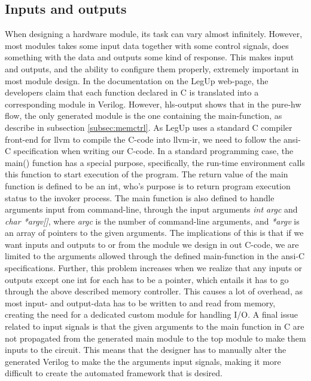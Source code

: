 \subsection{\label{subsec:inoutprobs}Inputs and outputs}
When designing a hardware module, its task can vary almost infinitely. However, most modules takes some input data together with some control signals, does something with the data and outputs some kind of response. This makes input and outputs, and the ability to configure them properly, extremely important in most module design. In the documentation on the LegUp web-page, the developers claim that each function declared in C is translated into a corresponding module in Verilog. However, \gls{hls}-output shows that in the pure-\gls{hw} flow, the only generated module is the one containing the main-function, as describe in subsection \ref{subsec:memctrl}. As LegUp uses a standard C compiler front-end for \gls{llvm} to compile the C-code into \gls{llvm}-\gls{ir}, we need to follow the \gls{ansi}-C specification when writing our C-code. In a standard programming case, the main() function has a special purpose, specifically, the run-time environment calls this function to start execution of the program. The return value of the main function is defined to be an int, who's purpose is to return program execution status to the invoker process. The main function is also defined to handle arguments input from command-line, through the input arguments \textit{int argc} and \textit{char *argv[]}, where \textit{argc} is the number of command-line arguments, and \textit{*argv} is an array of pointers to the given arguments. The implications of this is that if we want inputs and outputs to or from the module we design in out C-code, we are limited to the arguments allowed through the defined main-function in the \gls{ansi}-C specifications. Further, this problem increases when we realize that any inputs or outputs except one int for each has to be a pointer, which entails it has to go through the above described memory controller. This causes a lot of overhead, as most input- and output-data has to be written to and read from memory, creating the need for a dedicated custom module for handling I/O. A final issue related to input signals is that the given arguments to the main function in C are not propagated from the generated main module to the top module to make them inputs to the circuit. This means that the designer has to manually alter the generated Verilog to make the the arguments input signals, making it more difficult to create the automated framework that is desired.
